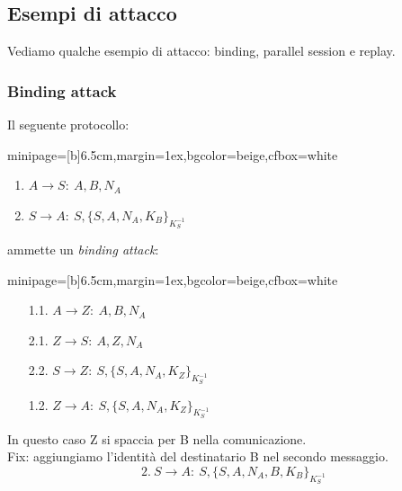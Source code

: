 \documentclass[a4paper, 11pt, notitlepage, fleqn]{report}
\newcommand{\fromto}[2]{#1\rightarrow #2\!:\ }
\newenvironment{colbox}[2]%
{%
	\par\noindent\hspace{10pt}
	\begin{adjustbox}{minipage=[b]{#2},margin=1ex,bgcolor=#1,cfbox=white}
}{%
	\end{adjustbox}\newline%
}
\begin{document}
\subsection{Esempi di attacco}
Vediamo qualche esempio di attacco: binding, parallel session e replay.

\subsubsection{Binding attack}
Il seguente protocollo:
\begin{colbox}{beige}{6.5cm}
	\begin{enumerate}
		\item $\fromto{A}{S}A,B,N_A$
		\item $\fromto{S}{A}S,\{S,A,N_A,K_B\}_{K_S^{-1}}$
	\end{enumerate}
\end{colbox}
ammette un \emph{binding attack}:
\begin{colbox}{beige}{6.5cm}
	\begin{enumerate}
		\item[1.1.] $\fromto{A}{Z}A,B,N_A$
		\item[2.1.] $\fromto{Z}{S}A,Z,N_A$
		\item[2.2.] $\fromto{S}{Z}S,\{S,A,N_A,K_Z\}_{K_S^{-1}}$
		\item[1.2.] $\fromto{Z}{A}S,\{S,A,N_A,K_Z\}_{K_S^{-1}}$
	\end{enumerate}
\end{colbox}
In questo caso Z si spaccia per B nella comunicazione.\\
Fix: aggiungiamo l'identità del destinatario B nel secondo messaggio.
\begin{equation*}
	2.\ \fromto{S}{A}S,\{S,A,N_A,B,K_B\}_{K_S^{-1}}
\end{equation*}
\end{document}
